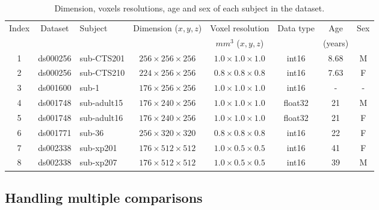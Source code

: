 \documentclass[lettersize,journal]{IEEEtran}
\begin{document}
\begin{table}
    \begin{center}
        \begin{tabular}{c|c|l|c|c|c|c|c}
            Index & Dataset  & Subject     & Dimension ($x,y,z$)         & Voxel resolution            & Data type & Age     & Sex \\
                  &          &             &                             & $mm^3$ ($x,y,z$)            &           & (years) &     \\
            \hline
            1     & ds000256 & sub-CTS201  & $256 \times 256 \times 256$ & $1.0 \times 1.0 \times 1.0$ & int16     & 8.68    & M   \\
            2     & ds000256 & sub-CTS210  & $224 \times 256 \times 256$ & $0.8 \times 0.8 \times 0.8$ & int16     & 7.63    & F   \\
            3     & ds001600 & sub-1       & $176 \times 256 \times 256$ & $1.0 \times 1.0 \times 1.0$ & int16     & -       & -   \\
            4     & ds001748 & sub-adult15 & $176 \times 240 \times 256$ & $1.0 \times 1.0 \times 1.0$ & float32   & 21      & M   \\
            5     & ds001748 & sub-adult16 & $176 \times 240 \times 256$ & $1.0 \times 1.0 \times 1.0$ & float32   & 21      & F   \\
            6     & ds001771 & sub-36      & $256 \times 320 \times 320$ & $0.8 \times 0.8 \times 0.8$ & int16     & 22      & F   \\
            7     & ds002338 & sub-xp201   & $176 \times 512 \times 512$ & $1.0 \times 0.5 \times 0.5$ & int16     & 41      & F   \\
            8     & ds002338 & sub-xp207   & $176 \times 512 \times 512$ & $1.0 \times 0.5 \times 0.5$ & int16     & 39      & M   \\
        \end{tabular}
    \end{center}
    \caption{Dimension, voxels resolutions, age and sex of each subject in the dataset.}
    \label{table:dataset_info}
\end{table}

\subsection{Handling multiple comparisons}
\end{document}
